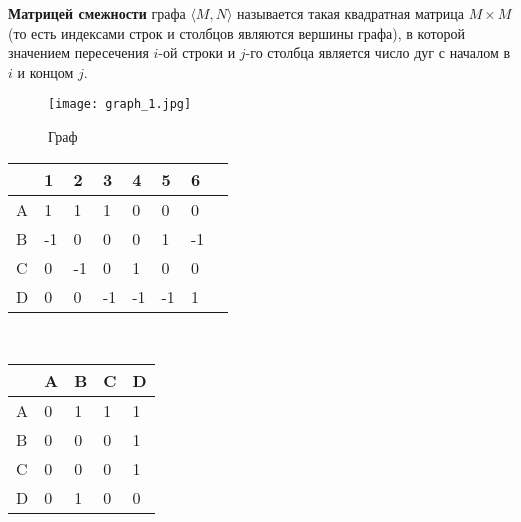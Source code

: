 \vspace{3mm}

\textbf{Матрицей смежности} графа $\langle M, N\rangle$ называется такая квадратная матрица $M \times M$
(то есть индексами строк и столбцов являются вершины графа), 
в которой значением пересечения $i$-ой строки и $j$-го столбца является число дуг с началом в $i$ и концом $j$.

\begin{figure}[!h]
    \centering 
    \texttt{[image: graph\_1.jpg]}
    \caption{Граф}
    \label{graph_for_matrix}
\end{figure}

\begin{figure*}[!h]
    \centering
    \begin{minipage}[t]{4cm}
        \centering
        \begin{tabular}[c]{ | l | l | l | l | l | l | l | l |}
            \hline
              & 1  & 2  & 3  & 4  & 5  & 6  \\ \hline
            A & 1  & 1  & 1  & 0  & 0  & 0  \\ \hline
            B & -1 & 0  & 0  & 0  & 1  & -1 \\ \hline
            C & 0  & -1 & 0  & 1  & 0  & 0  \\ \hline
            D & 0  & 0  & -1 & -1 & -1 & 1  \\
            \hline
        \end{tabular}
    \end{minipage}
    \hspace{3cm}
    \begin{minipage}[t]{4cm}\
        \centering
        \begin{tabular}[c]{ | l | l | l | l | l |}
            \hline
              & A & B & C & D \\ \hline
            A & 0 & 1 & 1 & 1 \\ \hline
            B & 0 & 0 & 0 & 1 \\ \hline
            C & 0 & 0 & 0 & 1 \\ \hline
            D & 0 & 1 & 0 & 0 \\
            \hline
        \end{tabular}
    \end{minipage}
    \caption{Способы матричного представления графа \ref{graph_for_matrix}: матрица инцидентности
    и матрица смежности соответственно}
\end{figure*}

\hspace{3mm}

